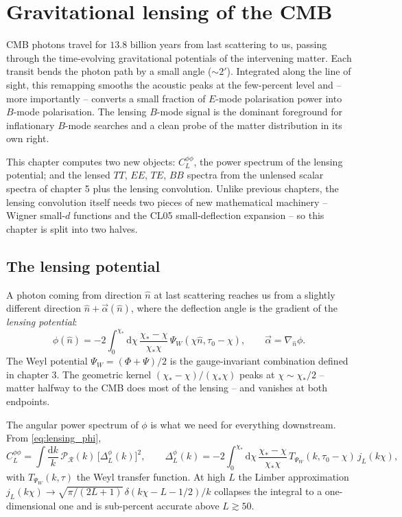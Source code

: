 \section{Gravitational lensing of the CMB}
\label{ch:lensing}

CMB photons travel for $13.8$ billion years from last scattering to us, passing through the time-evolving gravitational potentials of the intervening matter. Each transit bends the photon path by a small angle ($\sim 2'$). Integrated along the line of sight, this remapping smooths the acoustic peaks at the few-percent level and -- more importantly -- converts a small fraction of $E$-mode polarisation power into $B$-mode polarisation. The lensing $B$-mode signal is the dominant foreground for inflationary $B$-mode searches and a clean probe of the matter distribution in its own right.

This chapter computes two new objects: $C_L^{\phi\phi}$, the power spectrum of the lensing potential; and the lensed $TT$, $EE$, $TE$, $BB$ spectra from the unlensed scalar spectra of chapter 5 plus the lensing convolution. Unlike previous chapters, the lensing convolution itself needs two pieces of new mathematical machinery -- Wigner small-$d$ functions and the CL05 small-deflection expansion -- so this chapter is split into two halves.

\subsection{The lensing potential}

A photon coming from direction $\hat n$ at last scattering reaches us from a slightly different direction $\hat n + \vec\alpha(\hat n)$, where the deflection angle is the gradient of the \emph{lensing potential}:
\begin{equation}
  \phi(\hat n) = -2\int_0^{\chi_*}\mathrm{d}\chi\,\frac{\chi_* - \chi}{\chi_*\chi}\,\Psi_W(\chi \hat n, \tau_0 - \chi),
  \qquad \vec\alpha = \nabla_{\hat n}\phi.
  \label{eq:lensing_phi}
\end{equation}
The Weyl potential $\Psi_W = (\Phi + \Psi)/2$ is the gauge-invariant combination defined in chapter 3. The geometric kernel $(\chi_* - \chi)/(\chi_*\chi)$ peaks at $\chi \sim \chi_*/2$ -- matter halfway to the CMB does most of the lensing -- and vanishes at both endpoints.

The angular power spectrum of $\phi$ is what we need for everything downstream. From \cref{eq:lensing_phi},
\begin{equation}
  C_L^{\phi\phi} = \int \frac{\mathrm{d}k}{k}\,\mathcal{P}_\mathcal{R}(k)\,\bigl[\Delta^\phi_L(k)\bigr]^2,
  \qquad
  \Delta^\phi_L(k) = -2\int_0^{\chi_*}\mathrm{d}\chi\,\frac{\chi_* - \chi}{\chi_*\chi}\,T_{\Psi_W}(k, \tau_0 - \chi)\, j_L(k\chi),
  \label{eq:Cphiphi}
\end{equation}
with $T_{\Psi_W}(k, \tau)$ the Weyl transfer function. At high $L$ the Limber approximation $j_L(k\chi) \to \sqrt{\pi/(2L + 1)}\,\delta(k\chi - L - 1/2)/k$ collapses the integral to a one-dimensional one and is sub-percent accurate above $L \gtrsim 50$.

